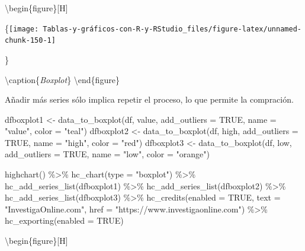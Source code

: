 \documentclass[
]{book}
\newenvironment{Shaded}{\begin{snugshade}}{\end{snugshade}}
\newcommand{\AttributeTok}[1]{\textcolor[rgb]{0.77,0.63,0.00}{#1}}
\newcommand{\ConstantTok}[1]{\textcolor[rgb]{0.00,0.00,0.00}{#1}}
\newcommand{\FunctionTok}[1]{\textcolor[rgb]{0.00,0.00,0.00}{#1}}
\newcommand{\NormalTok}[1]{#1}
\newcommand{\OtherTok}[1]{\textcolor[rgb]{0.56,0.35,0.01}{#1}}
\newcommand{\SpecialCharTok}[1]{\textcolor[rgb]{0.00,0.00,0.00}{#1}}
\newcommand{\StringTok}[1]{\textcolor[rgb]{0.31,0.60,0.02}{#1}}
\begin{document}
\textbackslash begin\{figure\}{[}H{]}

\{\centering \texttt{[image: Tablas-y-gráficos-con-R-y-RStudio\_files/figure-latex/unnamed-chunk-150-1]}

\}

\textbackslash caption\{\emph{Boxplot}\}\label{fig:unnamed-chunk-150}
\textbackslash end\{figure\}

Añadir más series sólo implica repetir el proceso, lo que permite la compración.

\begin{Shaded}
\begin{Highlighting}[]
\NormalTok{dfboxplot1 }\OtherTok{\textless{}{-}} \FunctionTok{data\_to\_boxplot}\NormalTok{(df, value, }\AttributeTok{add\_outliers =} \ConstantTok{TRUE}\NormalTok{, }
  \AttributeTok{name =} \StringTok{"value"}\NormalTok{, }\AttributeTok{color =} \StringTok{"teal"}\NormalTok{)}
\NormalTok{dfboxplot2 }\OtherTok{\textless{}{-}} \FunctionTok{data\_to\_boxplot}\NormalTok{(df, high, }\AttributeTok{add\_outliers =} \ConstantTok{TRUE}\NormalTok{, }
  \AttributeTok{name =} \StringTok{"high"}\NormalTok{, }\AttributeTok{color =} \StringTok{"red"}\NormalTok{)}
\NormalTok{dfboxplot3 }\OtherTok{\textless{}{-}} \FunctionTok{data\_to\_boxplot}\NormalTok{(df, low, }\AttributeTok{add\_outliers =} \ConstantTok{TRUE}\NormalTok{, }
  \AttributeTok{name =} \StringTok{"low"}\NormalTok{, }\AttributeTok{color =} \StringTok{"orange"}\NormalTok{)}

\FunctionTok{highchart}\NormalTok{() }\SpecialCharTok{\%\textgreater{}\%} \FunctionTok{hc\_chart}\NormalTok{(}\AttributeTok{type =} \StringTok{"boxplot"}\NormalTok{) }\SpecialCharTok{\%\textgreater{}\%} \FunctionTok{hc\_add\_series\_list}\NormalTok{(dfboxplot1) }\SpecialCharTok{\%\textgreater{}\%} 
  \FunctionTok{hc\_add\_series\_list}\NormalTok{(dfboxplot2) }\SpecialCharTok{\%\textgreater{}\%} \FunctionTok{hc\_add\_series\_list}\NormalTok{(dfboxplot3) }\SpecialCharTok{\%\textgreater{}\%} 
  \FunctionTok{hc\_credits}\NormalTok{(}\AttributeTok{enabled =} \ConstantTok{TRUE}\NormalTok{, }\AttributeTok{text =} \StringTok{"InvestigaOnline.com"}\NormalTok{, }
    \AttributeTok{href =} \StringTok{"https://www.investigaonline.com"}\NormalTok{) }\SpecialCharTok{\%\textgreater{}\%} \FunctionTok{hc\_exporting}\NormalTok{(}\AttributeTok{enabled =} \ConstantTok{TRUE}\NormalTok{)}
\end{Highlighting}
\end{Shaded}

\textbackslash begin\{figure\}{[}H{]}
\end{document}
